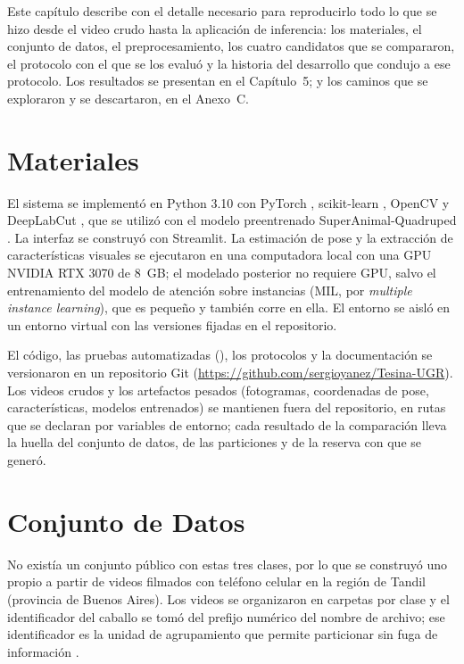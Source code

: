 
Este capítulo describe con el detalle necesario para reproducirlo todo lo que se hizo desde el video crudo hasta la aplicación de inferencia: los materiales, el conjunto de datos, el preprocesamiento, los cuatro candidatos que se compararon, el protocolo con el que se los evaluó y la historia del desarrollo que condujo a ese protocolo. Los resultados se presentan en el Capítulo~5; y los caminos que se exploraron y se descartaron, en el Anexo~C.

\section{Materiales}
El sistema se implementó en Python 3.10 con PyTorch \parencite{paszke2019}, scikit-learn \parencite{pedregosa2011}, OpenCV \parencite{bradski2000} y DeepLabCut \parencite{mathis2018}, que se utilizó con el modelo preentrenado SuperAnimal-Quadruped \parencite{ye2024}. La interfaz se construyó con Streamlit. La estimación de pose y la extracción de características visuales se ejecutaron en una computadora local con una GPU NVIDIA RTX 3070 de 8~GB; el modelado posterior no requiere GPU, salvo el entrenamiento del modelo de atención sobre instancias (MIL, por \textit{multiple instance learning}), que es pequeño y también corre en ella. El entorno se aisló en un entorno virtual con las versiones fijadas en el repositorio.

El código, las pruebas automatizadas (), los protocolos y la documentación se versionaron en un repositorio Git (\url{https://github.com/sergioyanez/Tesina-UGR}). Los videos crudos y los artefactos pesados (fotogramas, coordenadas de pose, características, modelos entrenados) se mantienen fuera del repositorio, en rutas que se declaran por variables de entorno; cada resultado de la comparación lleva la huella del conjunto de datos, de las particiones y de la reserva con que se generó.

\section{Conjunto de Datos}
No existía un conjunto público con estas tres clases, por lo que se construyó uno propio a partir de videos filmados con teléfono celular en la región de Tandil (provincia de Buenos Aires). Los videos se organizaron en carpetas por clase y el identificador del caballo se tomó del prefijo numérico del nombre de archivo; ese identificador es la unidad de agrupamiento que permite particionar sin fuga de información \parencite{kapoor2023}.

